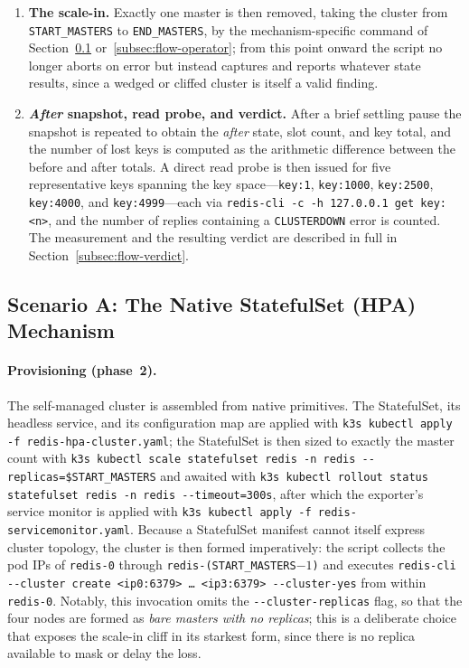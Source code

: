 \begin{enumerate}
  \item \textbf{The scale-in.} Exactly one master is then removed, taking the cluster from
  \texttt{START\_MASTERS} to \texttt{END\_MASTERS}, by the mechanism-specific command of
  Section~\ref{subsec:flow-hpa} or~\ref{subsec:flow-operator}; from this point onward the
  script no longer aborts on error but instead captures and reports whatever state results,
  since a wedged or cliffed cluster is itself a valid finding.

  \item \textbf{\emph{After} snapshot, read probe, and verdict.} After a brief settling
  pause the snapshot is repeated to obtain the \emph{after} state, slot count, and key total,
  and the number of lost keys is computed as the arithmetic difference between the before and
  after totals. A direct read probe is then issued for five representative keys spanning the
  key space---\texttt{key:1}, \texttt{key:1000}, \texttt{key:2500}, \texttt{key:4000}, and
  \texttt{key:4999}---each via \texttt{redis-cli -c -h 127.0.0.1 get key:<n>}, and the number
  of replies containing a \texttt{CLUSTERDOWN} error is counted. The measurement and the
  resulting verdict are described in full in Section~\ref{subsec:flow-verdict}.
\end{enumerate}

\subsection{Scenario A: The Native StatefulSet (HPA) Mechanism}\label{subsec:flow-hpa}

\paragraph{Provisioning (phase~2).} The self-managed cluster is assembled from native
primitives. The StatefulSet, its headless service, and its configuration map are applied
with \texttt{k3s kubectl apply -f redis-hpa-cluster.yaml}; the StatefulSet is then sized to
exactly the master count with
\texttt{k3s kubectl scale statefulset redis -n redis -{}-replicas=\$START\_MASTERS} and
awaited with \texttt{k3s kubectl rollout status statefulset redis -n redis -{}-timeout=300s},
after which the exporter's service monitor is applied with
\texttt{k3s kubectl apply -f redis-servicemonitor.yaml}. Because a StatefulSet manifest
cannot itself express cluster topology, the cluster is then formed imperatively: the script
collects the pod IPs of \texttt{redis-0} through \texttt{redis-(START\_MASTERS$-1$)} and
executes \texttt{redis-cli -{}-cluster create <ip0:6379> {\ldots} <ip3:6379> -{}-cluster-yes}
from within \texttt{redis-0}. Notably, this invocation omits the \texttt{-{}-cluster-replicas}
flag, so that the four nodes are formed as \emph{bare masters with no replicas}; this is a
deliberate choice that exposes the scale-in cliff in its starkest form, since there is no
replica available to mask or delay the loss.

